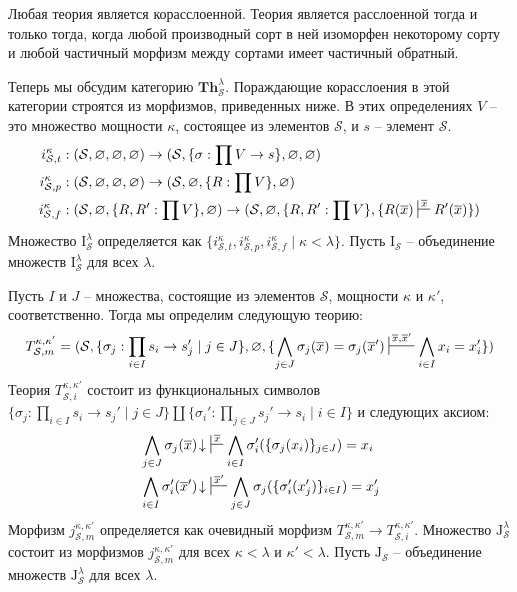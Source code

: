 \documentclass[reqno]{amsart}
\theoremstyle{definition}
\theoremstyle{remark}
\newcommand{\bcat}[1]{\mathbf{#1}}
\newcommand{\Th}{\bcat{Th}}
\newcommand{\I}{\mathrm{I}}
\newcommand{\J}{\mathrm{J}}
\begin{document}
\begin{remark}
Любая теория является корасслоенной.
Теория является расслоенной тогда и только тогда, когда любой производный сорт в ней изоморфен некоторому сорту и любой частичный морфизм между сортами имеет частичный обратный.
\end{remark}

Теперь мы обсудим категорию $\Th^\lambda_\mathcal{S}$.
Пораждающие корасслоения в этой категории строятся из морфизмов, приведенных ниже.
В этих определениях $V$ -- это множество мощности $\kappa$, состоящее из элементов $\mathcal{S}$, и $s$ -- элемент $\mathcal{S}$.
\begin{align*}
i_{\mathcal{S},t}^\kappa & : (\mathcal{S}, \varnothing, \varnothing, \varnothing) \to (\mathcal{S}, \{ \sigma : \prod V \to s \}, \varnothing, \varnothing) \\
i_{\mathcal{S},p}^\kappa & : (\mathcal{S}, \varnothing, \varnothing, \varnothing) \to (\mathcal{S}, \varnothing, \{ R : \prod V \}, \varnothing) \\
i_{\mathcal{S},f}^\kappa & : (\mathcal{S}, \varnothing, \{ R, R' : \prod V \}, \varnothing) \to (\mathcal{S}, \varnothing, \{ R, R' : \prod V \}, \{ R(\overline{x}) \sststile{}{\overline{x}} R'(\overline{x}) \})
\end{align*}
Множество $\I_\mathcal{S}^\lambda$ определяется как $\{ i_{\mathcal{S},t}^\kappa, i_{\mathcal{S},p}^\kappa, i_{\mathcal{S},f}^\kappa \mid \kappa < \lambda \}$.
Пусть $\I_\mathcal{S}$ -- объединение множеств $\I_\mathcal{S}^\lambda$ для всех $\lambda$.

Пусть $I$ и $J$ -- множества, состоящие из элементов $\mathcal{S}$, мощности $\kappa$ и $\kappa'$, соответственно.
Тогда мы определим следующую теорию:
\[ T_{\mathcal{S},m}^{\kappa,\kappa'} = (\mathcal{S}, \{ \sigma_j : \prod_{i \in I} s_i \to s_j' \mid j \in J \}, \varnothing, \{ \bigwedge_{j \in J} \sigma_j(\overline{x}) = \sigma_j(\overline{x}') \sststile{}{\overline{x},\overline{x}'} \bigwedge_{i \in I} x_i = x_i' \}) \]
Теория $T_{\mathcal{S},i}^{\kappa,\kappa'}$ состоит из функциональных символов $\{ \sigma_j : \prod_{i \in I} s_i \to s_j' \mid j \in J \} \amalg \{ \sigma_i' : \prod_{j \in J} s_j' \to s_i \mid i \in I \}$ и следующих аксиом:
\begin{align*}
& \bigwedge_{j \in J} \sigma_j(\overline{x})\!\downarrow\ \sststile{}{\overline{x}} \bigwedge_{i \in I} \sigma_i'(\{ \sigma_j(x_i) \}_{j \in J}) = x_i \\
& \bigwedge_{i \in I} \sigma_i'(\overline{x}')\!\downarrow\ \sststile{}{\overline{x}'} \bigwedge_{j \in J} \sigma_j(\{ \sigma_i'(x_j') \}_{i \in I}) = x_j'
\end{align*}
Морфизм $j_{\mathcal{S},m}^{\kappa,\kappa'}$ определяется как очевидный морфизм $T_{\mathcal{S},m}^{\kappa,\kappa'} \to T_{\mathcal{S},i}^{\kappa,\kappa'}$.
Множество $\J_\mathcal{S}^\lambda$ состоит из морфизмов $j_{\mathcal{S},m}^{\kappa,\kappa'}$ для всех $\kappa < \lambda$ и $\kappa' < \lambda$.
Пусть $\J_\mathcal{S}$ -- объединение множеств $\J_\mathcal{S}^\lambda$ для всех $\lambda$.
\end{document}
